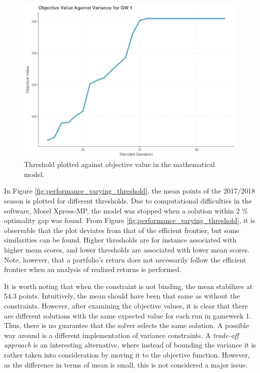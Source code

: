 \begin{figure}[H]
    \centering
    \includegraphics[scale=0.5]{fig/chapter_7/GW1_var.png}
    \caption{Threshold plotted against objective value in the mathematical model.}
\label{fig:threshold_GW1}    
\end{figure}%


In Figure \ref{fig:performance_varying_threshold}, the mean points of the 2017/2018 season is plotted for different thresholds. Due to computational difficulties in the software, Mosel Xpress-MP, the model was stopped when a solution within 2 \% optimality gap was found. From Figure \ref{fig:performance_varying_threshold}, it is observable that the plot deviates from that of the efficient frontier, but some similarities can be found. Higher thresholds are for instance associated with higher mean scores, and lower thresholds are associated with lower mean scores. Note, however, that a portfolio's return does not necessarily follow the efficient frontier when an analysis of realized returns is performed.

\newpar

It is worth noting that when the constraint is not binding, the mean stabilizes at 54.3 points. Intuitively, the mean should have been that same as without the constraints. However, after examining the objective values, it is clear that there are different solutions with the same expected value for each run in gameweek 1. Thus, there is no guarantee that the solver selects the same solution. A possible way around is a different implementation of variance constraints. A \textit{trade-off approach} \citep{Speranza} is an interesting alternative, where instead of bounding the variance it is rather taken into consideration by moving it to the objective function. However, as the difference in terms of mean is small, this is not considered a major issue.

